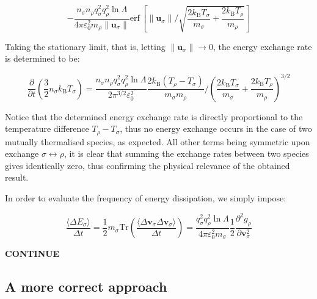\begin{equation}
    \label{eq-fokker-138}
    -\frac{n_\sigma n_\rho q_\sigma^2q_\rho^2\ln{\Lambda}}{4\pi\varepsilon_0^2m_\rho\|\mathbf{u}_\sigma\|}\text{erf}\,\left[\|\mathbf{u}_\sigma\|\bigg/\sqrt{\frac{2k_\mathrm{B}T_\sigma}{m_\sigma}+\frac{2k_\mathrm{B}T_\rho}{m_\rho}}\right]
\end{equation}

Taking the stationary limit, that is, letting $\|\mathbf{u}_\sigma\|\to0$, the energy exchange rate is determined to be:

\begin{equation}
    \label{eq-fokker-139}
    \frac{\partial}{\partial t}\left(\frac{3}{2}n_\sigma k_\mathrm{B}T_\sigma\right)=\frac{n_\sigma n_\rho q_\sigma^2q_\rho^2\ln{\Lambda}}{2\pi^{3/2}\varepsilon_0^2}\frac{2k_\mathrm{B}(T_\rho-T_\sigma)}{m_\sigma m_\rho}\bigg/\left(\frac{2k_\mathrm{B}T_\sigma}{m_\sigma}+\frac{2k_\mathrm{B}T_\rho}{m_\rho}\right)^{3/2}
\end{equation}

Notice that the determined energy exchange rate is directly proportional to the temperature difference $T_\rho-T_\sigma$, thus no energy exchange occurs in the case of two mutually thermalised species, as expected. All other terms being symmetric upon exchange $\sigma\leftrightarrow\rho$, it is clear that summing the exchange rates between two species gives identically zero, thus confirming the physical relevance of the obtained result.

\quad In order to evaluate the frequency of energy dissipation, we simply impose:

\begin{equation}
    \frac{\langle\Delta E_\sigma\rangle}{\Delta t}=\frac{1}{2}m_\sigma\text{Tr}\left(\frac{\langle\Delta\mathbf{v}_\sigma\Delta\mathbf{v}_\sigma\rangle}{\Delta t}\right)=\frac{q_\sigma^2q_\rho^2\ln{\Lambda}}{4\pi\varepsilon_0^2m_\sigma}\frac{1}{2}\frac{\partial^2g_\rho}{\partial\mathbf{v}_\sigma^2}
\end{equation}

\begin{center}
    \textbf{CONTINUE}
\end{center}

\subsection{A more correct approach}

\label{9-a-more-correct-approach}

